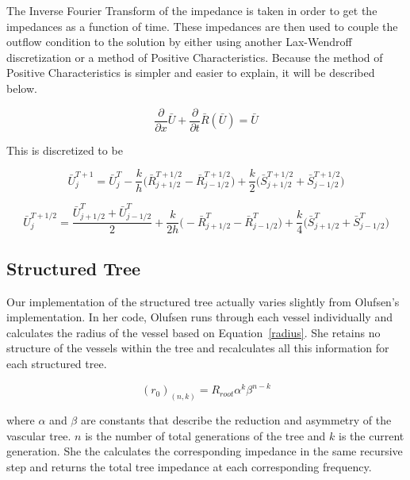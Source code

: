 \documentclass[12pt]{article}
\newcommand{\partder}[2]{\frac{\partial #1}{\partial #2}}
\newcommand{\tensor}[1]{\bar{#1}}
\newcommand{\tensplus}[3]{\tensor{#1}_{#2}^{#3}}
\begin{document}
The Inverse Fourier Transform of the impedance is taken in order to get the impedances as a function of time. These impedances are then used to couple the outflow condition to the solution by either using another Lax-Wendroff discretization or a method of Positive Characteristics. Because the method of Positive Characteristics is simpler and easier to explain, it will be described below. 

\begin{equation} 
	\label{discrete1}
	\partder{}{x} \tensor{U} + \partder{}{t} \tensor{R}(\tensor{U}) = \tensor{U}
\end{equation}


This is discretized to be 

\begin{equation}
	\label{bigu1}
	\tensplus{U}{j}{T+1} = \tensplus{U}{j}{T} - \frac{k}{h} \Bigg(\tensplus{R}{j+1/2}{T+1/2} - \tensplus{R}{j-1/2}{T+1/2} \Bigg) + \frac{k}{2} \Bigg(\tensplus{S}{j+1/2}{T+1/2} + \tensplus{S}{j-1/2}{T+1/2} \Bigg)
\end{equation}

\begin{equation}
	\label{bigu2}
	\tensplus{U}{j}{T+1/2} = \frac{\tensplus{U}{j+1/2}{T} + \tensplus{U}{j-1/2}{T}}{2} + \frac{k}{2h} \Bigg(-\tensplus{R}{j+1/2}{T} - \tensplus{R}{j-1/2}{T} \Bigg)  + \frac{k}{4} \Bigg(\tensplus{S}{j+1/2}{T} + \tensplus{S}{j-1/2}{T} \Bigg)
\end{equation}

\subsection{Structured Tree}
Our implementation of the structured tree actually varies slightly from Olufsen's implementation. In her code, Olufsen runs through each vessel individually and calculates the radius of the vessel based on Equation~\eqref{radius}. She retains no structure of the vessels within the tree and recalculates all this information for each structured tree.

\begin{equation}
	\label{radius}
	(r_0)_(n,k) = R_{root} \alpha^k\beta^{n-k}
\end{equation}

where $\alpha$ and $\beta$ are constants that describe the reduction and asymmetry of the vascular tree. $n$ is the number of total generations of the tree and $k$ is the current generation. She the calculates the corresponding impedance in the same recursive step and returns the total tree impedance at each corresponding frequency. 
\end{document}

